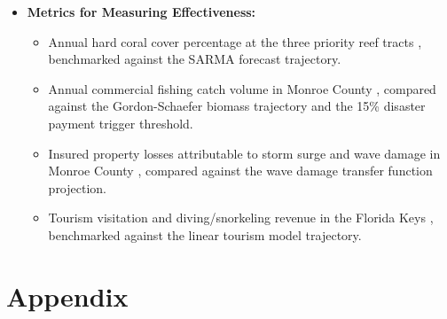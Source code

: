 \documentclass[10pt,letterpaper]{article}
\begin{document}
\begin{itemize}
\begin{itemize}
        \item \textit{Immediate (Year 1):} Parametric reserve is operational; fishermen can receive disaster payments within the first season.
        \item \textit{Short-term (Years 1--5):} Coral nursery infrastructure is deployed; early out-planting cohorts are established; MPA enforcement increases fish biomass within protected zones.
        \item \textit{Medium-term (Years 5--15):} Measurable coral cover recovery at Molasses Reef, Looe Key, and Carysfort Reef; Gordon-Schaefer biomass trajectories begin to diverge positively from the status quo collapse curve; wave attenuation improvements become detectable in storm damage insurance claims.
        \item \textit{Long-term (Years 15--30):} NPV loss trajectory trends toward the Restoration scenario, with cumulative avoided losses in the billions of dollars for Monroe County and its insurers.
    \end{itemize}
    \item \textbf{Metrics for Measuring Effectiveness:}
    \begin{itemize}
        \item Annual hard coral cover percentage at the three priority reef tracts \cite{noaa_ncrmp}, benchmarked against the SARMA forecast trajectory.
        \item Annual commercial fishing catch volume in Monroe County \cite{fwc_fishing_records}, compared against the Gordon-Schaefer biomass trajectory and the 15\% disaster payment trigger threshold.
        \item Insured property losses attributable to storm surge and wave damage in Monroe County \cite{fema_nfip}, compared against the wave damage transfer function projection.
        \item Tourism visitation and diving/snorkeling revenue in the Florida Keys \cite{monroe_tdc_2023}, benchmarked against the linear tourism model trajectory.
    \end{itemize}
\end{itemize}
\restoregeometry

\newpage

\section*{Appendix}
\end{document}
